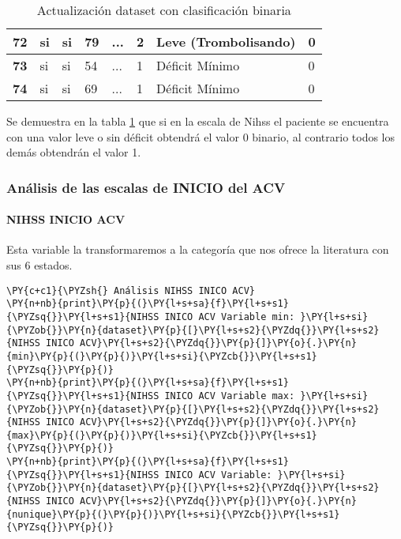 \begin{table}[H]
{\begin{tabular}{|c|l|l|l|l|l|l|l|}
\textbf{72} & si & si & 79 & ... & 2 & Leve (Trombolisando) & 0 \\ \hline
\textbf{73} & si & si & 54 & ... & 1 & Déficit Mínimo & 0 \\ \hline
\textbf{74} & si & si & 69 & ... & 1 & Déficit Mínimo & 0 \\ \hline
\end{tabular}%
}
\caption{Actualización dataset con clasificación binaria}
\label{tab:Nihss estable o grave tabla}
\end{table}

	Se demuestra en la tabla \ref{tab:Nihss estable o grave tabla} que si en la escala de Nihss el paciente se encuentra con una valor leve o sin déficit obtendrá el valor 0 binario, al contrario todos los demás obtendrán el valor 1.
        
    \hypertarget{anuxe1lisis-de-las-las-escalas-de-inicio-del-acv}{%
\subsubsection{Análisis de las escalas de INICIO del
ACV}\label{anuxe1lisis-de-las-las-escalas-de-inicio-del-acv}}

    \hypertarget{nihss-inico-acv}{%
\paragraph{NIHSS INICIO ACV}\label{nihss-inico-acv}}

Esta variable la transformaremos a la categoría que nos ofrece la literatura con sus 6 estados.

    \begin{tcolorbox}[breakable, size=fbox, boxrule=1pt, pad at break*=1mm,colback=cellbackground, colframe=cellborder]
\begin{Verbatim}[commandchars=\\\{\}]
\PY{c+c1}{\PYZsh{} Análisis NIHSS INICO ACV}
\PY{n+nb}{print}\PY{p}{(}\PY{l+s+sa}{f}\PY{l+s+s1}{\PYZsq{}}\PY{l+s+s1}{NIHSS INICO ACV Variable min: }\PY{l+s+si}{\PYZob{}}\PY{n}{dataset}\PY{p}{[}\PY{l+s+s2}{\PYZdq{}}\PY{l+s+s2}{NIHSS INICO ACV}\PY{l+s+s2}{\PYZdq{}}\PY{p}{]}\PY{o}{.}\PY{n}{min}\PY{p}{(}\PY{p}{)}\PY{l+s+si}{\PYZcb{}}\PY{l+s+s1}{\PYZsq{}}\PY{p}{)}
\PY{n+nb}{print}\PY{p}{(}\PY{l+s+sa}{f}\PY{l+s+s1}{\PYZsq{}}\PY{l+s+s1}{NIHSS INICO ACV Variable max: }\PY{l+s+si}{\PYZob{}}\PY{n}{dataset}\PY{p}{[}\PY{l+s+s2}{\PYZdq{}}\PY{l+s+s2}{NIHSS INICO ACV}\PY{l+s+s2}{\PYZdq{}}\PY{p}{]}\PY{o}{.}\PY{n}{max}\PY{p}{(}\PY{p}{)}\PY{l+s+si}{\PYZcb{}}\PY{l+s+s1}{\PYZsq{}}\PY{p}{)}
\PY{n+nb}{print}\PY{p}{(}\PY{l+s+sa}{f}\PY{l+s+s1}{\PYZsq{}}\PY{l+s+s1}{NIHSS INICO ACV Variable: }\PY{l+s+si}{\PYZob{}}\PY{n}{dataset}\PY{p}{[}\PY{l+s+s2}{\PYZdq{}}\PY{l+s+s2}{NIHSS INICO ACV}\PY{l+s+s2}{\PYZdq{}}\PY{p}{]}\PY{o}{.}\PY{n}{nunique}\PY{p}{(}\PY{p}{)}\PY{l+s+si}{\PYZcb{}}\PY{l+s+s1}{\PYZsq{}}\PY{p}{)}
\end{Verbatim}
\end{tcolorbox}

